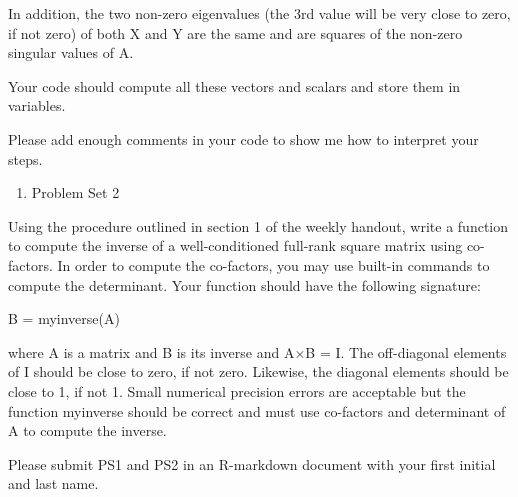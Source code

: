 \documentclass[]{article}
\providecommand{\tightlist}{%
  \setlength{\itemsep}{0pt}\setlength{\parskip}{0pt}}
\begin{document}
In addition, the two non-zero eigenvalues (the 3rd value will be very
close to zero, if not zero) of both X and Y are the same and are squares
of the non-zero singular values of A.

Your code should compute all these vectors and scalars and store them in
variables.

Please add enough comments in your code to show me how to interpret your
steps.

\begin{enumerate}
\def\labelenumi{\arabic{enumi}.}
\setcounter{enumi}{1}
\tightlist
\item
  Problem Set 2
\end{enumerate}

Using the procedure outlined in section 1 of the weekly handout, write a
function to compute the inverse of a well-conditioned full-rank square
matrix using co-factors. In order to compute the co-factors, you may use
built-in commands to compute the determinant. Your function should have
the following signature:

B = myinverse(A)

where A is a matrix and B is its inverse and A×B = I. The off-diagonal
elements of I should be close to zero, if not zero. Likewise, the
diagonal elements should be close to 1, if not 1. Small numerical
precision errors are acceptable but the function myinverse should be
correct and must use co-factors and determinant of A to compute the
inverse.

Please submit PS1 and PS2 in an R-markdown document with your first
initial and last name.
\end{document}
